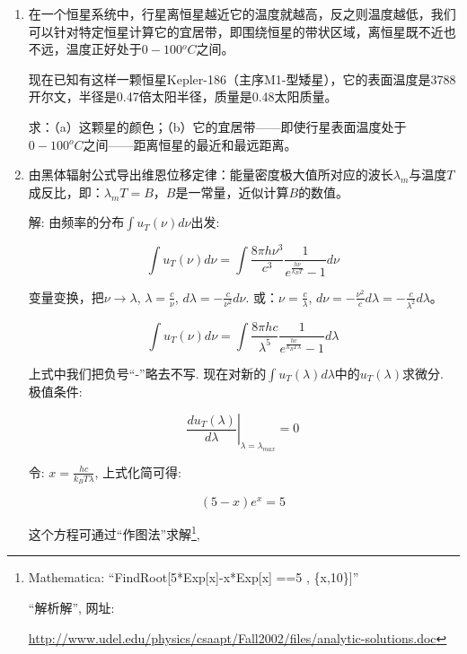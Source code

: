 \begin{enumerate}
\item 

在一个恒星系统中，行星离恒星越近它的温度就越高，反之则温度越低，我们可以针对特定恒星计算它的宜居带，即围绕恒星的带状区域，离恒星既不近也不远，温度正好处于$0-100 {}^o C$之间。

现在已知有这样一颗恒星Kepler-186（主序M1-型矮星），它的表面温度是3788开尔文，半径是0.47倍太阳半径，质量是0.48太阳质量。

求：（a）这颗星的颜色；（b）它的宜居带——即使行星表面温度处于$0-100 {}^o C$之间——距离恒星的最近和最远距离。


\item

由黑体辐射公式导出维恩位移定律：能量密度极大值所对应的波长$\lambda_m$与温度$T$成反比，即：$\lambda_m T = B$，$B$是一常量，近似计算$B$的数值。

解: 由频率的分布$\int u_T(\nu) d\nu$出发:

\begin{equation}
\int u_T(\nu)d\nu =\int  \frac{8\pi h
\nu^3}{c^3}\frac{1}{e^{\frac{h\nu}{k_B T}} -1} d \nu~
\end{equation}

变量变换，把$\nu \to \lambda$, $\lambda = \frac{c}{\nu}$, $d \lambda = - \frac{c}{\nu^2} d \nu$. 或：$\nu = \frac{c}{\lambda}$, $d\nu = - \frac{\nu^2}{c} d\lambda=-\frac{c}{\lambda^2}d\lambda$。

\begin{equation}
\int u_T(\nu) d \nu = \int \frac{8\pi
hc}{\lambda^5}\frac{1}{e^{\frac{hc}{k_B T\lambda}}-1} d\lambda~
\end{equation}

上式中我们把负号“-”略去不写. 现在对新的$\int u_T(\lambda)
d\lambda$中的$u_T(\lambda)$求微分. 极值条件:

\begin{equation}
\left. {\frac{d u_T(\lambda)}{d\lambda}} \right|_{\lambda =
\lambda_{max}} = 0~
\end{equation}

令: $x = \frac{hc}{k_B T \lambda}$, 上式化简可得:

\begin{equation}
(5-x)e^x =5~
\end{equation}

这个方程可通过``作图法''求解\footnote{Mathematica:
``FindRoot[5*Exp[x]-x*Exp[x] ==5 , \{x,10\}]''

``解析解'', 网址:

\url{http://www.udel.edu/physics/csaapt/Fall2002/files/analytic-solutions.doc}},


\end{enumerate}
